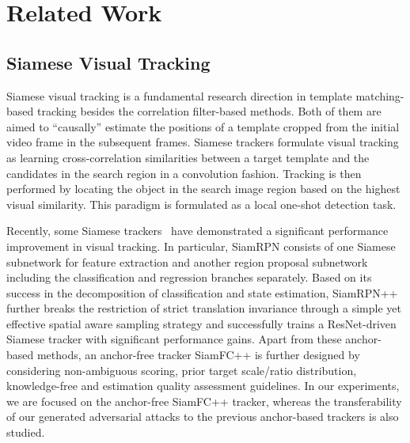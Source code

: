 \documentclass[journal]{IEEEtran}
\begin{document}

\section{Related Work}

\subsection{Siamese Visual Tracking}

Siamese visual tracking is a fundamental research direction in template matching-based tracking besides the correlation filter-based methods. Both of them are aimed to ``causally'' estimate the positions of a template cropped from the initial video frame in the subsequent frames. Siamese trackers formulate visual tracking as learning cross-correlation similarities between a target template and the candidates in the search region in a convolution fashion. Tracking is then performed by locating the object in the search image region based on the highest visual similarity. This paradigm is formulated as a local one-shot detection task.

Recently, some Siamese trackers~\cite{SiamFC++,SiamRPN,SiamRPN++} have demonstrated a significant performance improvement in visual tracking. 
In particular, SiamRPN \cite{SiamRPN} consists of one Siamese subnetwork for feature extraction and another region proposal subnetwork including the classification and regression branches separately. Based on its success in the decomposition of classification and state estimation, SiamRPN++ \cite{SiamRPN++} further breaks the restriction of strict translation invariance through a simple yet effective spatial aware sampling strategy and successfully trains a ResNet-driven Siamese tracker with significant performance gains. Apart from these anchor-based methods, an anchor-free tracker SiamFC++ \cite{SiamFC++} is further designed by considering non-ambiguous scoring, prior target scale/ratio distribution, knowledge-free and estimation quality assessment guidelines.
In our experiments, we are focused on the anchor-free SiamFC++ tracker, whereas the transferability of our generated adversarial attacks to the previous anchor-based trackers is also studied.
\end{document}
